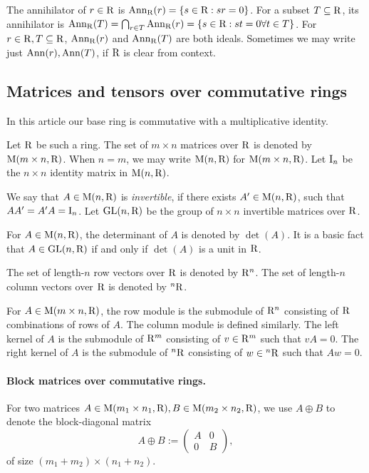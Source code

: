 The annihilator of $r \in \mathrm{R}$ is $\mathrm{Ann}_{\mathrm{R}}(r) = \{s \in \mathrm{R} : sr = 0\}$. For a subset $T \subseteq \mathrm{R}$, its annihilator is $\mathrm{Ann}_{\mathrm{R}}(T) = \bigcap_{r \in T} \mathrm{Ann}_{\mathrm{R}}(r) = \{s \in \mathrm{R} : st = 0 \forall t \in T\}$. For $r \in \mathrm{R}, T \subseteq \mathrm{R}$, $\mathrm{Ann}_{\mathrm{R}}(r)$ and $\mathrm{Ann}_{\mathrm{R}}(T)$ are both ideals. Sometimes we may write just $\mathrm{Ann}(r), \mathrm{Ann}(T)$, if $\mathrm{R}$ is clear from context.

\subsection{Matrices and tensors over commutative rings}

In this article our base ring is commutative with a multiplicative identity. 

Let $\mathrm{R}$ be such a ring. The set of $m\times n$ matrices over $\mathrm{R}$ is denoted by $\mathrm{M}(m\times n, \mathrm{R})$. When $n=m$, we may write $\mathrm{M}(n, \mathrm{R})$ for $\mathrm{M}(m\times n, \mathrm{R})$. Let $\mathrm{I}_n$ be the $n\times n$ identity matrix in $\mathrm{M}(n, \mathrm{R})$. 

We say that $A\in\mathrm{M}(n, \mathrm{R})$ is \emph{invertible}, if there exists $A'\in \mathrm{M}(n, \mathrm{R})$, such that $AA'=A'A=\mathrm{I}_n$. Let $\mathrm{GL}(n, \mathrm{R})$ be the group of $n\times n$ invertible matrices over $\mathrm{R}$. 

For $A\in \mathrm{M}(n, \mathrm{R})$, the determinant of $A$ is denoted by $\det(A)$. It is a basic fact that $A\in \mathrm{GL}(n, \mathrm{R})$ if and only if $\det(A)$ is a unit in $\mathrm{R}$. 

The set of length-$n$ row vectors over $\mathrm{R}$ is denoted by $\mathrm{R}^n$. The set of length-$n$ column vectors over $\mathrm{R}$ is denoted by $^n\mathrm{R}$.

For $A\in \mathrm{M}(m\times n, \mathrm{R})$, the row module is the submodule of $\mathrm{R}^n$ consisting of $\mathrm{R}$ combinations of rows of $A$. The column module is defined similarly. The left kernel of $A$ is the submodule of $\mathrm{R}^m$ consisting of $v\in\mathrm{R}^m$ such that $vA=0$. The right kernel of $A$ is the submodule of $^n\mathrm{R}$ consisting of $w\in{}^n\mathrm{R}$ such that $Aw=0$.

\paragraph{Block matrices over commutative rings.} 
For two matrices $A \in \mathrm{M}(m_1 \times n_1, \mathrm{R}), B \in \mathrm{M}(m_2 \times n_2, \mathrm{R})$, we use $A \oplus B$ to denote the block-diagonal matrix
\[
A \oplus B := \begin{pmatrix} 
A & 0 \\
0 & B 
\end{pmatrix},
\]
of size $(m_1 + m_2) \times (n_1 + n_2)$.


